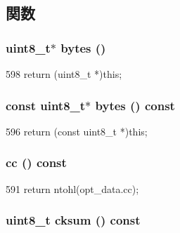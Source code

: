 \subsection{関数}
\hypertarget{structNet_1_1TcpOpt_add4fb6fe45a091194dc9eac521194698}{
\subsubsection[{bytes}]{\setlength{\rightskip}{0pt plus 5cm}uint8\_\-t$\ast$ bytes ()}}
\label{structNet_1_1TcpOpt_add4fb6fe45a091194dc9eac521194698}



\begin{DoxyCode}
598 { return (uint8_t *)this; }
\end{DoxyCode}
\hypertarget{structNet_1_1TcpOpt_aaa586eeaf354005403ca8e20f961b6c3}{
\subsubsection[{bytes}]{\setlength{\rightskip}{0pt plus 5cm}const uint8\_\-t$\ast$ bytes () const}}
\label{structNet_1_1TcpOpt_aaa586eeaf354005403ca8e20f961b6c3}



\begin{DoxyCode}
596 { return (const uint8_t *)this; }
\end{DoxyCode}
\hypertarget{structNet_1_1TcpOpt_a0c5bd4685231a3185f123fccb2a8313d}{
\subsubsection[{cc}]{ cc () const}}
\label{structNet_1_1TcpOpt_a0c5bd4685231a3185f123fccb2a8313d}



\begin{DoxyCode}
591 { return ntohl(opt_data.cc); }
\end{DoxyCode}
\hypertarget{structNet_1_1TcpOpt_a0e5c67cd3adfdeed4e0e17fd18e8dc62}{
\subsubsection[{cksum}]{\setlength{\rightskip}{0pt plus 5cm}uint8\_\-t cksum () const}}
\label{structNet_1_1TcpOpt_a0e5c67cd3adfdeed4e0e17fd18e8dc62}



